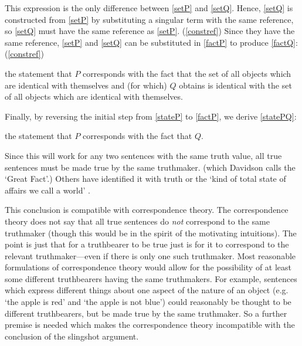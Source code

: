 This expression is the only difference between \ref{setP} and \ref{setQ}.
Hence, \ref{setQ} is constructed from \ref{setP} by substituting a singular term with the same reference, so \ref{setQ} must have the same reference as \ref{setP}.
(\ref{constref})
Since they have the same reference, \ref{setP} and \ref{setQ} can be substituted in \ref{factP} to produce \ref{factQ}:
(\ref{constref}) 

	\begin{example}\label{factQ}
	the statement that $P$ corresponds with the fact that the set of all objects which are identical with themselves and (for which) $Q$ obtains is identical with the set of all objects which are identical with themselves.
	\end{example}

Finally, by reversing the initial step from \ref{stateP} to \ref{factP}, we derive \ref{statePQ}:

	\begin{example}\label{statePQ}
	the statement that $P$ corresponds with the fact that $Q$.
	\end{example}

Since this will work for any two sentences with the same truth value, all true sentences must be made true by the same truthmaker. (which Davidson calls the `Great Fact'.)
\parencite[753]{Davidson_1969}
Others have identified it with truth \parencite[216]{Frege_1948} or the `kind of total state of affairs we call a world' \parencite[242]{Lewis1943-LEWTMO}.


This conclusion is compatible with correspondence theory.
The correspondence theory does not say that all true sentences do \emph{not} correspond to the same truthmaker (though this would be in the spirit of the motivating intuitions).
The point is just that for a truthbearer to be true just is for it to correspond to the relevant truthmaker---even if there is only one such truthmaker.
Most reasonable formulations of correspondence theory would allow for the possibility of at least some different truthbearers having the same truthmakers.
For example, sentences which express different things about one aspect of the nature of an object (e.g. `the apple is red' and `the apple is not blue')	could reasonably be thought to be different truthbearers, but be made true by the same truthmaker.
So a further premise is needed which makes the correspondence theory incompatible with the conclusion of the slingshot argument.

